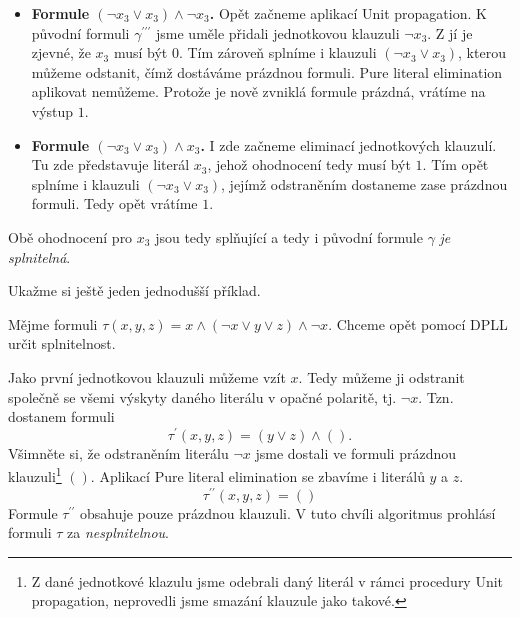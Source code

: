 \begin{example}
    \begin{itemize}
        \item \textbf{Formule $(\neg x_3\lor x_3)\land\neg x_3$.} Opět začneme aplikací Unit propagation. K původní formuli $\gamma^{\prime\prime\prime}$ jsme uměle přidali jednotkovou klauzuli $\neg x_3$. Z jí je zjevné, že $x_3$ musí být $0$. Tím zároveň splníme i klauzuli $(\neg x_3\lor x_3)$, kterou můžeme odstanit, čímž dostáváme prázdnou formuli. Pure literal elimination aplikovat nemůžeme. Protože je nově zvniklá formule prázdná, vrátíme na výstup $1$.
        \item \textbf{Formule $(\neg x_3\lor x_3)\land x_3$.} I zde začneme eliminací jednotkových klauzulí. Tu zde představuje literál $x_3$, jehož ohodnocení tedy musí být $1$. Tím opět splníme i klauzuli $(\neg x_3\lor x_3)$, jejímž odstraněním dostaneme zase prázdnou formuli. Tedy opět vrátíme $1$.
    \end{itemize}
    Obě ohodnocení pro $x_3$ jsou tedy splňující a tedy i původní formule $\gamma$ \emph{je splnitelná}.
\end{example}

Ukažme si ještě jeden jednodušší příklad.
\begin{example}
    Mějme formuli $\tau(x,y,z)=x\land (\neg x\lor y\lor z)\land \neg x$. Chceme opět pomocí DPLL určit splnitelnost.

    Jako první jednotkovou klauzuli můžeme vzít $x$. Tedy můžeme ji odstranit společně se všemi výskyty daného literálu v opačné polaritě, tj. $\neg x$. Tzn. dostanem formuli
    \[\tau^\prime(x,y,z)=(y\lor z)\land().\]
    Všimněte si, že odstraněním literálu $\neg x$ jsme dostali ve formuli prázdnou klauzuli\footnote{Z dané jednotkové klazulu jsme odebrali daný literál v rámci procedury Unit propagation, neprovedli jsme smazání klauzule jako takové.} $()$. Aplikací Pure literal elimination se zbavíme i literálů $y$ a $z$.
    \[\tau^{\prime\prime}(x,y,z)=()\]
    Formule $\tau^{\prime\prime}$ obsahuje pouze prázdnou klauzuli. V tuto chvíli algoritmus prohlásí formuli $\tau$ za \emph{nesplnitelnou}.
\end{example}

